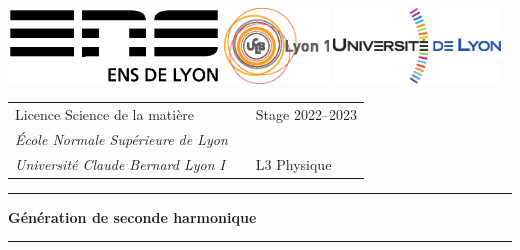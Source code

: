 \documentclass[11pt,a4paper]{article}
\begin{document}
\renewcommand{\v}[1]{\mathbf{#1}}
\newcommand{\tens}[1]{\underline{#1}}
\setlength{\parindent}{0pt}

\hypersetup{pageanchor=false}
\thispagestyle{empty}

\begin{@empty}

\includegraphics[height=2cm]{logoens.eps} \hfill \includegraphics[height=2cm]{logoucbl.eps} \hfill \includegraphics[height=2cm]{logounivlyon.eps}

\vspace{0.5cm}

\begin{tabularx}{\textwidth}{@{} l X l @{} }
{\sc Licence Science de la matière} 	&	& Stage 2022--2023 \\
{\it \'Ecole Normale Sup\'erieure de Lyon}		&	&  \\
{\it Universit\'e Claude Bernard Lyon I}		& 	& L3 Physique
\end{tabularx}

\begin{center}

\vspace{1.5cm}

\rule[11pt]{5cm}{0.5pt}

\textbf{\huge Génération de seconde harmonique}

\rule{5cm}{0.5pt}

\vspace{1.5cm}


\end{center}
\end{@empty}
\end{document}
